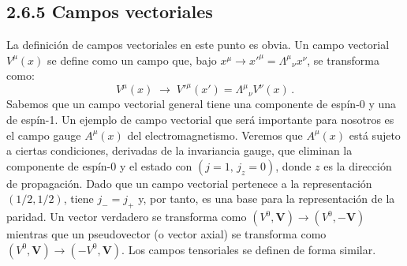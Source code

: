 \documentclass[a4paper,11pt]{book} %
\begin{document}
\subsection*{2.6.5 \quad Campos vectoriales}
\noindent
La definición de campos vectoriales en este punto es obvia. Un campo vectorial $V^{\mu}(x)$ se define como un campo que, bajo
$x^{\mu}\rightarrow x'^{\mu}=\Lambda^{\mu}{}_{\nu}x^{\nu}$, se transforma como:
\begin{equation}
V^{\mu}(x)\;\rightarrow\;V'^{\mu}(x')=\Lambda^{\mu}{}_{\nu}V^{\nu}(x)\,.
\end{equation}
\noindent
Sabemos que un campo vectorial general tiene
una componente de espín-0 y una de espín-1. Un ejemplo de campo vectorial que
será importante para nosotros es el campo gauge $A^{\mu}(x)$ del
electromagnetismo. Veremos que $A^{\mu}(x)$ está sujeto a
ciertas condiciones, derivadas de la invariancia gauge, que eliminan la
componente de espín-0 y el estado con $(j=1,\,j_{z}=0)$, donde $z$ es la
dirección de propagación.
\medskip\newline
Dado que un campo vectorial pertenece a la representación $(1/2,1/2)$, tiene
$j_{-}=j_{+}$ y, por tanto, es una base para la representación de la paridad. Un
vector verdadero se transforma como $(V^{0},\mathbf{V})\rightarrow(V^{0},-\mathbf{V})$
mientras que un pseudovector (o vector axial) se transforma como
$(V^{0},\mathbf{V})\rightarrow(-V^{0},\mathbf{V})$.
\medskip\newline
Los campos tensoriales se definen de forma similar.
 
\end{document}
